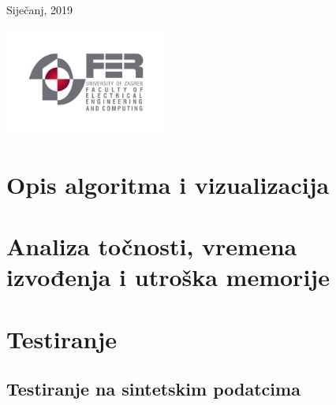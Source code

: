 \documentclass[a4paper]{article}
\begin{document}
\begin{titlepage}
	
	
	\vfill\vfill\vfill %
	
	{\large Siječanj, 2019} %
	
	
	\vfill\vfill
	\includegraphics[width=0.4\textwidth]{fer_logo.jpg}\\[1cm] %
	 
	
	\vfill %
	
\end{titlepage}






\section{Opis algoritma i vizualizacija}

\section{Analiza točnosti, vremena izvođenja i utroška memorije}

\section{Testiranje}
\subsection{Testiranje na sintetskim podatcima}
\end{document}
